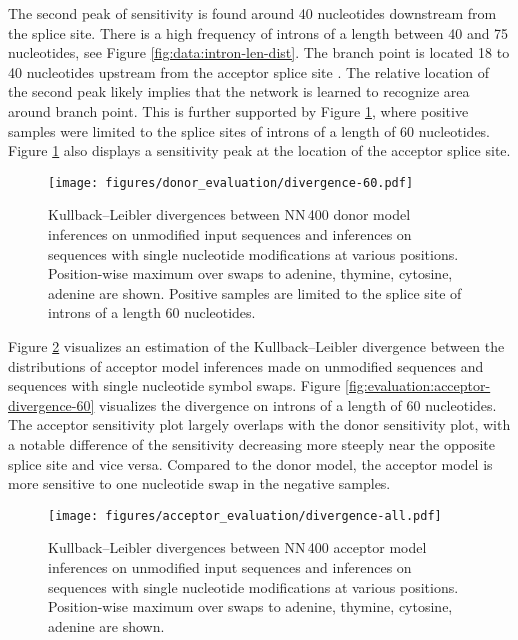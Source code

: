 The second peak of sensitivity is found around 40 nucleotides downstream from
the splice site. There is a high frequency of introns of a length between 40
and 75 nucleotides, see Figure \ref{fig:data:intron-len-dist}. The branch point
is located 18 to 40 nucleotides upstream from the acceptor splice site
\cite{clancy2008rna}. The relative location of the second peak likely implies
that the network is learned to recognize area around branch point. This is
further supported by Figure \ref{fig:evaluation:donor-divergence-60}, where
positive samples were limited to the splice sites of introns of a length of 60
nucleotides. Figure \ref{fig:evaluation:donor-divergence-60} also displays a
sensitivity peak at the location of the acceptor splice site.

\begin{figure}
  \centering
  \texttt{[image: figures/donor\_evaluation/divergence-60.pdf]}
  \caption{Kullback–Leibler divergences between NN\,400 donor model inferences
    on unmodified input sequences and inferences on sequences with single
    nucleotide modifications at various positions. Position-wise maximum over
    swaps to adenine, thymine, cytosine, adenine are shown. Positive samples
    are limited to the splice site of introns of a length 60 nucleotides.}
  \label{fig:evaluation:donor-divergence-60}
\end{figure}

Figure \ref{fig:evaluation:acceptor-divergence-all} visualizes an estimation of
the Kullback–Leibler divergence between the distributions of acceptor model
inferences made on unmodified sequences and sequences with single nucleotide
symbol swaps. Figure \ref{fig:evaluation:acceptor-divergence-60} visualizes the
divergence on introns of a length of 60 nucleotides. The acceptor sensitivity
plot largely overlaps with the donor sensitivity plot, with a notable
difference of the sensitivity decreasing more steeply near the opposite splice
site and vice versa. Compared to the donor model, the acceptor model is more
sensitive to one nucleotide swap in the negative samples.

\begin{figure}
  \centering
  \texttt{[image: figures/acceptor\_evaluation/divergence-all.pdf]}
  \caption{Kullback–Leibler divergences between NN\,400 acceptor model
    inferences on unmodified input sequences and inferences on sequences with
    single nucleotide modifications at various positions. Position-wise maximum
    over swaps to adenine, thymine, cytosine, adenine are shown.}
  \label{fig:evaluation:acceptor-divergence-all}
\end{figure}

